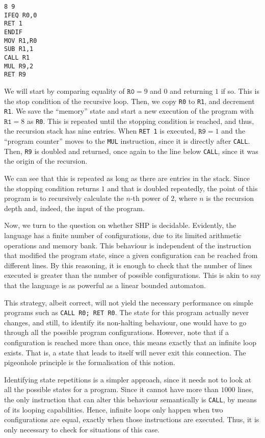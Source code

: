 \documentclass[12pt]{article}
\begin{document}
{\footnotesize
\begin{verbatim}
8 9
IFEQ R0,0
RET 1
ENDIF
MOV R1,R0
SUB R1,1
CALL R1
MUL R9,2
RET R9
\end{verbatim}}

We will start by comparing equality of $\texttt{R0} = 9$ and $0$ and returning $1$ if so. This is the stop condition of the recursive loop. Then, we copy \texttt{R0} to \texttt{R1}, and decrement \texttt{R1}. We save the ``memory'' state and start a new execution of the program with $\texttt{R1} = 8$ as \texttt{R0}. This is repeated until the stopping condition is reached, and thus, the recursion stack has nine entries. When \texttt{RET 1} is executed, $\texttt{R9} = 1$ and the ``program counter'' moves to the \texttt{MUL} instruction, since it is directly after \texttt{CALL}. Then, \texttt{R9} is doubled and returned, once again to the line below \texttt{CALL}, since it was the origin of the recursion. 

We can see that this is repeated as long as there are entries in the stack. Since the stopping condition returns $1$ and that is doubled repeatedly, the point of this program is to recursively calculate the $n$-th power of $2$, where $n$ is the recursion depth and, indeed, the input of the program.

Now, we turn to the question on whether SHP is decidable. Evidently, the language has a finite number of configurations, due to its limited arithmetic operations and memory bank. This behaviour is independent of the instruction that modified the program state, since a given configuration can be reached from different lines. By this reasoning, it is enough to check that the number of lines executed is greater than the number of possible configurations. This is akin to say that the language is as powerful as a linear bounded automaton.

This strategy, albeit correct, will not yield the necessary performance on simple programs such as \texttt{CALL R0; RET R0}. The state for this program actually never changes, and still, to identify its non-halting behaviour, one would have to go through all the possible program configurations. However, note that if a configuration is reached more than once, this means exactly that an infinite loop exists. That is, a state that leads to itself will never exit this connection. The pigeonhole principle is the formalisation of this notion. 

Identifying state repetitions is a simpler approach, since it needs not to look at all the possible states for a program. Since it cannot have more than $1000$ lines, the only instruction that can alter this behaviour semantically is \texttt{CALL}, by means of its looping capabilities. Hence, infinite loops only happen when two configurations are equal, exactly when those instructions are executed. Thus, it is only necessary to check for situations of this case.
\end{document}
